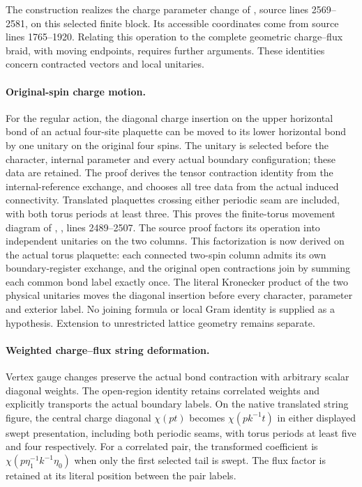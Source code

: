 \documentclass{article}
\begin{document}
The construction realizes the charge parameter change of
\cite[\S6.6]{Schuch2010PEPS}, source lines 2569--2581, on this selected
finite block. Its accessible coordinates come from source lines
1765--1920. Relating this operation to the complete geometric
charge--flux braid, with moving endpoints, requires further arguments.
These identities concern contracted vectors and local unitaries.

\paragraph{Original-spin charge motion.}
For the regular action, the diagonal charge insertion on the upper horizontal
bond of an actual four-site plaquette can be moved to its lower horizontal
bond by one unitary on the original four spins. The unitary is selected before
the character, internal parameter and every actual boundary configuration;
these data are retained. The proof derives the tensor contraction identity
from the internal-reference exchange, and chooses all tree data from the
actual induced connectivity. Translated plaquettes crossing either periodic
seam are included, with both torus periods at least three. This proves the
finite-torus movement diagram of \cite{Schuch2010PEPS},
, lines 2489--2507. The source proof
factors its operation into independent unitaries on the two columns. This
factorization is now derived on the actual torus plaquette: each connected
two-spin column admits its own boundary-register exchange, and the original
open contractions join by summing each common bond label exactly once.
The literal Kronecker product of the two physical unitaries moves the
diagonal insertion before every character, parameter and exterior label.
No joining formula or local Gram identity is supplied as a hypothesis.
Extension to unrestricted lattice geometry remains separate.

\paragraph{Weighted charge--flux string deformation.}
Vertex gauge changes preserve the actual bond contraction with arbitrary
scalar diagonal weights. The open-region identity retains correlated weights
and explicitly transports the actual boundary labels. On the native translated
string figure, the central charge diagonal $\chi(pt)$ becomes
$\chi(pk^{-1}t)$ in either displayed swept presentation, including both
periodic seams, with torus periods at least five and four respectively.
For a correlated pair, the transformed coefficient is
$\chi(p\eta_1^{-1}k^{-1}\eta_0)$ when only the first selected tail is swept.
The flux factor is retained at its literal position between the pair labels.
\end{document}
